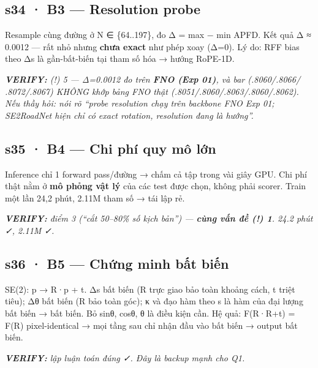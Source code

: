 \documentclass[
  11pt,
]{article}
\renewenvironment{quote}
  {\par\smallskip\noindent
   \def\FrameCommand{{\color{deckorange}\vrule width 2.5pt}\hspace{10pt}}%
   \MakeFramed{\advance\hsize-\width\FrameRestore}%
   \footnotesize\itshape\color{deckslate}}
  {\par\endMakeFramed\smallskip}
\begin{document}
\subsection{s34 · B3 --- Resolution
probe}\label{s34-b3-resolution-probe}

Resample cùng đường ở N ∈ \{64..197\}, đo Δ = max − min APFD. Kết quả Δ
≈ 0.0012 --- rất nhỏ nhưng \textbf{chưa exact} như phép xoay (Δ=0). Lý
do: RFF bias theo Δs là gần-bất-biến tại tham số hóa → hướng RoPE-1D.

\begin{quote}
\textbf{VERIFY:} (!) 5 --- Δ=0.0012 đo trên \textbf{FNO (Exp 01)}, và
bar (.8060/.8066/ .8072/.8067) KHÔNG khớp bảng FNO thật
(.8051/.8060/.8063/.8060/.8062). Nếu thầy hỏi: nói rõ ``probe resolution
chạy trên backbone FNO Exp 01; SE2RoadNet hiện chỉ có exact rotation,
resolution đang là hướng''.
\end{quote}

\subsection{s35 · B4 --- Chi phí quy mô
lớn}\label{s35-b4-chi-phuxed-quy-muxf4-lux1edbn}

Inference chỉ 1 forward pass/đường → chấm cả tập trong vài giây GPU. Chi
phí thật nằm ở \textbf{mô phỏng vật lý} của các test được chọn, không
phải scorer. Train một lần 24,2 phút, 2.11M tham số → tái lập rẻ.

\begin{quote}
\textbf{VERIFY:} điểm 3 (``cắt 50--80\% số kịch bản'') --- \textbf{cùng
vấn đề (!) 1}. 24.2 phút ✓, 2.11M ✓.
\end{quote}

\subsection{s36 · B5 --- Chứng minh bất
biến}\label{s36-b5-chux1ee9ng-minh-bux1ea5t-biux1ebfn}

SE(2): p → R·p + t. Δs bất biến (R trực giao bảo toàn khoảng cách, t
triệt tiêu); \textbar Δθ\textbar{} bất biến (R bảo toàn góc); κ và đạo
hàm theo s là hàm của đại lượng bất biến → bất biến. Bỏ sinθ, cosθ, θ là
điều kiện cần. Hệ quả: F(R·R+t) = F(R) pixel-identical → mọi tầng sau
chỉ nhận đầu vào bất biến → output bất biến.

\begin{quote}
\textbf{VERIFY:} lập luận toán đúng ✓. Đây là backup mạnh cho Q1.
\end{quote}
\end{document}
